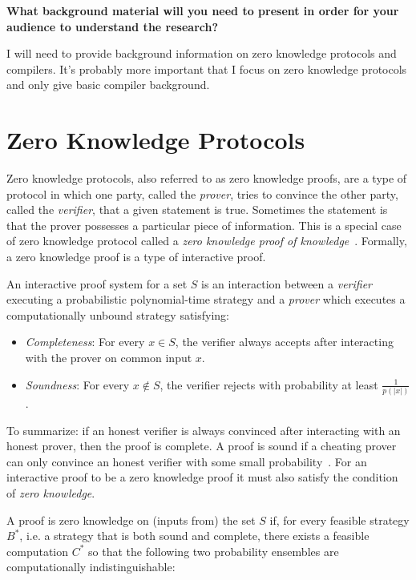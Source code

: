 \documentclass{sig-alternate}
\begin{document}
	\textbf{What background material will you need to present in order for your audience to understand the research?}
	
	I will need to provide background information on zero knowledge protocols and
	compilers. It's probably more important that I focus on zero knowledge protocols and
	only give basic compiler background.
	


\section{Zero Knowledge Protocols}
	Zero knowledge protocols, also referred to as zero knowledge proofs, are a type
	of protocol in which one party, called the \textit{prover}, tries to convince the 
	other party, called the \textit{verifier}, that a given statement is true. Sometimes
	the statement is that the prover possesses a particular piece of information. This
	is a special case of zero knowledge protocol called a \textit{zero knowledge proof
	of knowledge}~\cite{Wiki}. Formally, a zero knowledge proof is a type of interactive
	proof.
	
	An interactive proof system for a set $S$ is an interaction between a
	\textit{verifier} executing a probabilistic polynomial-time strategy and
	a \textit{prover} which executes a computationally unbound strategy 
	satisfying:
			
	\begin{itemize}
		\item \textit{Completeness}: For every $ x \in S$, the verifier always
		accepts after interacting with the prover on common input $x$.
			
		\item \textit{Soundness}: For every $x \notin S$, the verifier		
		rejects with probability at least $\frac{1}{p(|x|)}$.
	\end{itemize}
				
	To summarize: if an honest verifier is always convinced after interacting with
	an honest prover, then the proof is complete. A proof is sound if a cheating
	prover can only convince an honest verifier with some small probability~\cite{Survey}.	
	For an interactive proof to be a zero knowledge proof it must also
	satisfy the condition of \textit{zero knowledge}.	
		
	A proof is zero knowledge on (inputs from) the set $S$ if, for every feasible
	strategy $B^{*}$, i.e. a strategy that is both sound and complete,
	there exists a feasible computation $C^{*}$ so that the
	following two probability ensembles are computationally indistinguishable:
			
\end{document}
